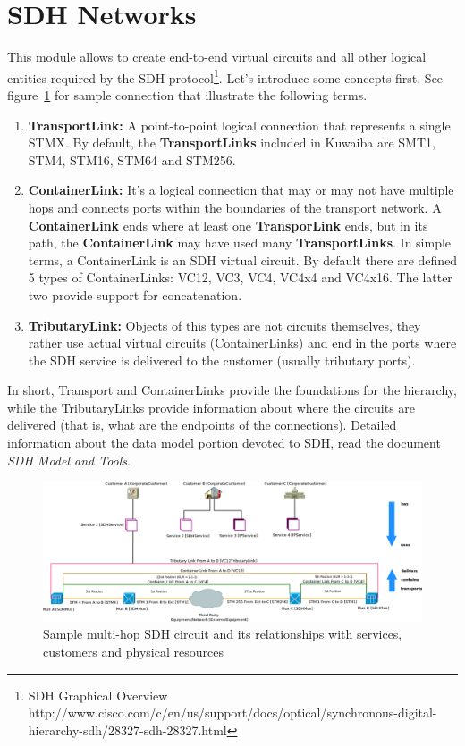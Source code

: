 \documentclass[a4paper]{article}
\begin{document}
	\section{SDH Networks}
		This module allows to create end-to-end virtual circuits and all other logical entities required by the SDH protocol\footnote{SDH Graphical Overview http://www.cisco.com/c/en/us/support/docs/optical/synchronous-digital-hierarchy-sdh/28327-sdh-28327.html}. Let's introduce some concepts first. See figure~\ref{fig:sdh_module_description} for sample connection that illustrate the following terms.
		\begin{enumerate}
			\item \textbf{TransportLink:} A point-to-point logical connection that represents a single STMX. By default, the \textbf{TransportLinks} included in Kuwaiba are SMT1, STM4, STM16, STM64 and STM256.
			\item \textbf{ContainerLink:} It's a  logical connection that may or may not have multiple hops and connects ports within the boundaries of the transport network. A \textbf{ContainerLink} ends where at least one \textbf{TransporLink} ends, but in its path, the \textbf{ContainerLink} may have used many \textbf{TransportLinks}. In simple terms, a ContainerLink is an SDH virtual circuit. By default there are defined 5 types of ContainerLinks: VC12, VC3, VC4, VC4x4 and VC4x16. The latter two provide support for concatenation.
			\item \textbf{TributaryLink:} Objects of this types are not circuits themselves, they rather use actual virtual circuits (ContainerLinks) and end in the ports where the SDH service is delivered to the customer (usually tributary ports).
		\end{enumerate}
		In short, Transport and ContainerLinks provide the foundations for the hierarchy, while the TributaryLinks provide information about where the circuits are delivered (that is, what are the endpoints of the connections). Detailed information about the data model portion devoted to SDH, read the document \textit{SDH Model and Tools}.
		\newpage
		\begin{landscape}
			\begin{figure}
				\centering
				\includegraphics[width=\linewidth]{img/sdh_module_description.png}
				\caption{Sample multi-hop SDH circuit and its relationships with services, customers and physical resources}
				\label{fig:sdh_module_description}
			\end{figure}
		\end{landscape}
\end{document}
